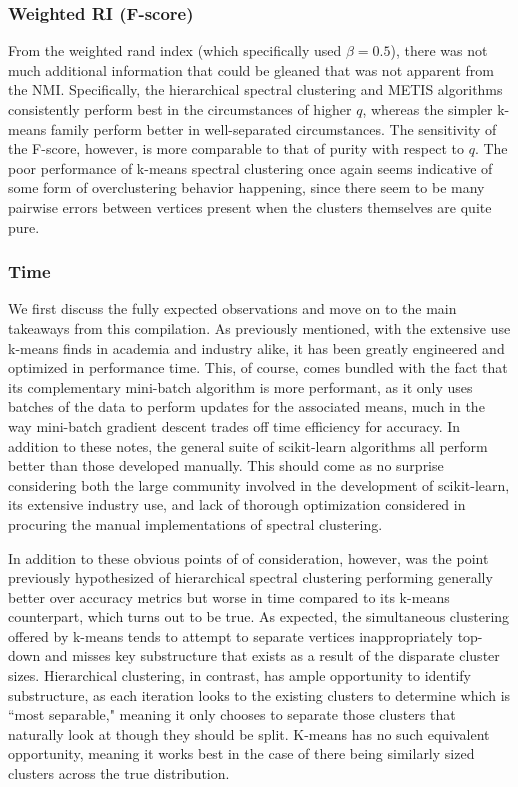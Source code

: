 \documentclass{article}
\begin{document}
\subsubsection{Weighted RI (F-score)}
From the weighted rand index (which specifically used $\beta=0.5$), there was not much additional information that could be gleaned that was not apparent from the NMI. Specifically, the hierarchical spectral clustering and METIS algorithms consistently perform best in the circumstances of higher $q$, whereas the simpler k-means family perform better in well-separated circumstances. The sensitivity of the F-score, however, is more comparable to that of purity with respect to $q$. The poor performance of k-means spectral clustering once again seems indicative of some form of overclustering behavior happening, since there seem to be many pairwise errors between vertices present when the clusters themselves are quite pure.

\subsubsection{Time}
We first discuss the fully expected observations and move on to the main takeaways from this compilation. As previously mentioned, with the extensive use k-means finds in academia and industry alike, it has been greatly engineered and optimized in performance time. This, of course, comes bundled with the fact that its complementary mini-batch algorithm is more performant, as it only uses batches of the data to perform updates for the associated means, much in the way mini-batch gradient descent trades off time efficiency for accuracy. In addition to these notes, the general suite of scikit-learn algorithms all perform better than those developed manually. This should come as no surprise considering both the large community involved in the development of scikit-learn, its extensive industry use, and lack of thorough optimization considered in procuring the manual implementations of spectral clustering.

In addition to these obvious points of of consideration, however, was the point previously hypothesized of hierarchical spectral clustering performing generally better over accuracy metrics but worse in time compared to its k-means counterpart, which turns out to be true. As expected, the simultaneous clustering offered by k-means tends to attempt to separate vertices inappropriately top-down and misses key substructure that exists as a result of the disparate cluster sizes. Hierarchical clustering, in contrast, has ample opportunity to identify substructure, as each iteration looks to the existing clusters to determine which is ``most separable," meaning it only chooses to separate those clusters that naturally look at though they should be split. K-means has no such equivalent opportunity, meaning it works best in the case of there being similarly sized clusters across the true distribution. 
\end{document}
